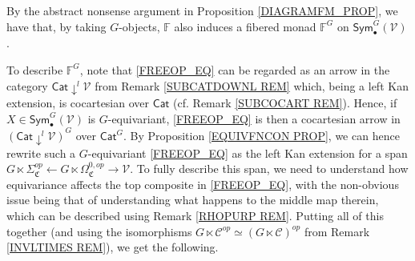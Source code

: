 \documentclass[a4paper,10pt
,draft
]{article}%
\numberwithin{equation}{section}
\numberwithin{figure}{section}
\theoremstyle{definition} %
\newcommand{\V}{\ensuremath{\mathcal V}}
\newcommand{\1}{\ensuremath{\mathbbm 1}}%
\begin{document}
By the abstract nonsense argument in 
Proposition \ref{DIAGRAMFM_PROP},
we have that, by taking $G$-objects, 
$\mathbb{F}$ also induces a fibered monad 
$\mathbb{F}^G$ on $\mathsf{Sym}^G_{\bullet}(\V)$.

To describe $\mathbb{F}^G$,
note that \eqref{FREEOP_EQ}
can be regarded as an arrow in 
the category $\mathsf{Cat} \downarrow^l \V$
from Remark \ref{SUBCATDOWNL REM}
which, being a left Kan extension, is cocartesian over $\mathsf{Cat}$ (cf. Remark \ref{SUBCOCART REM}).
Hence, if $X \in \mathsf{Sym}_{\bullet}^G(\V)$
is $G$-equivariant, 
\eqref{FREEOP_EQ} is then a cocartesian arrow in 
$\left(\mathsf{Cat} \downarrow^l \V\right)^G$
over $\mathsf{Cat}^G$.
By Proposition \ref{EQUIVFNCON PROP},
we can hence rewrite 
such a $G$-equivariant \eqref{FREEOP_EQ}
as the left Kan extension for a span
$G \ltimes \Sigma^{op}_{\mathfrak{C}}
\leftarrow 
G \ltimes \Omega^{0,op}_{\mathfrak{C}}
\to 
\V$.
To fully describe this span,
we need to understand how equivariance 
affects the top composite in \eqref{FREEOP_EQ},
with the non-obvious issue being that of understanding
what happens to the middle map
therein, which can be described using
Remark \ref{RHOPURP REM}.
Putting all of this together
(and using the isomorphisms
$G \ltimes \mathcal{C}^{op} \simeq (G \ltimes \mathcal{C})^{op}$
from Remark \ref{INVLTIMES REM}),
we get the following.
\end{document}
